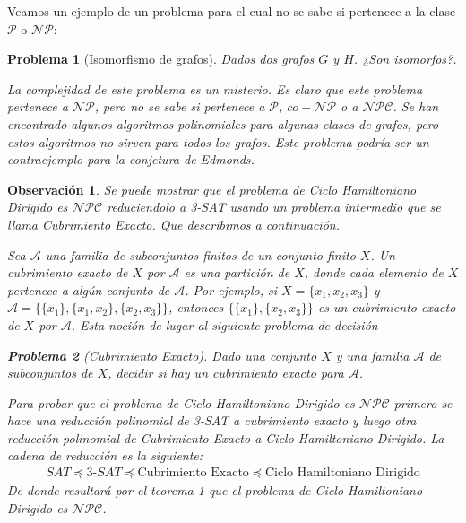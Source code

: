 \documentclass{article}
\newtheorem{problem}{Problema}
\newtheorem{obs}{Observación}
\begin{document}
Veamos un ejemplo de un problema para el cual no se sabe si
pertenece a la clase $\mathcal{P}$ o $\mathcal{NP}$:

\begin{problem}[Isomorfismo de grafos]
Dados dos grafos $G$ y $H$. ¿Son isomorfos?.

La complejidad de este problema es un misterio. Es claro que
este problema pertenece a $\mathcal{NP}$, pero no se sabe
si pertenece a $\mathcal{P}$, $co-\mathcal{NP}$ o a $\mathcal{NPC}$.
Se han encontrado algunos algoritmos polinomiales para algunas
clases de grafos, pero estos algoritmos no sirven para todos
los grafos. Este problema podría ser un contraejemplo para
la conjetura de Edmonds.
\end{problem}

\begin{obs}
    Se puede mostrar que el problema de Ciclo Hamiltoniano
    Dirigido es $\mathcal{NPC}$ reduciendolo a 3-SAT usando
    un problema intermedio que se llama Cubrimiento Exacto.
    Que describimos a continuación.
    
        Sea $\mathcal{A}$ una familia de subconjuntos
        finitos de un conjunto finito $X$. Un cubrimiento exacto
        de $X$ por $\mathcal{A}$ es una partición de $X$, donde
        cada elemento de $X$ pertenece a algún conjunto de 
        $\mathcal{A}$. Por ejemplo, si $X = \{x_1, x_2, x_3\}$
        y $\mathcal{A} = \{\{x_1\},\{x_1,x_2\},\{x_2,x_3\}\}$,
        entonces
        $\{\{x_1\},\{x_2,x_3\}\}$ es un cubrimiento exacto de $X$
        por $\mathcal{A}$. Esta noción de lugar al siguiente
        problema de decisión
    \begin{problem}[Cubrimiento Exacto]
        Dado una conjunto $X$ y una familia $\mathcal{A}$ de
        subconjuntos de $X$, decidir si hay un cubrimiento exacto
        para $\mathcal{A}$.
    \end{problem}
    Para probar que el problema de Ciclo Hamiltoniano Dirigido
    es $\mathcal{NPC}$ primero se hace una reducción polinomial
    de 3-SAT a cubrimiento exacto y luego otra reducción polinomial
    de Cubrimiento Exacto a Ciclo Hamiltoniano Dirigido. La cadena
    de reducción es la siguiente:
    \begin{align*}
    SAT \preceq 3\text{-}SAT \preceq \text{Cubrimiento Exacto}  \preceq
    \text{Ciclo Hamiltoniano Dirigido}
    \end{align*}
    De donde resultará por el teorema 1 que el problema de
    Ciclo Hamiltoniano Dirigido es $\mathcal{NPC}$.
\end{obs}
\end{document}
